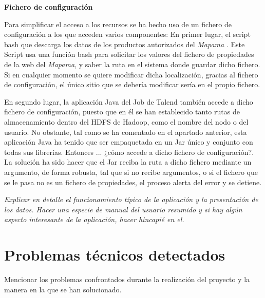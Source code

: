 \bigskip
\par 
\textbf{Fichero de configuración}
\par
Para simplificar el acceso a los recursos se ha hecho uso de un fichero de configuración a los que acceden varios componentes: En primer lugar, el script bash que descarga los datos de los productos autorizados del \textit{Mapama} \cite{mapama}. Este Script usa una función bash para solicitar los valores del fichero de propiedades de la web del \textit{Mapama}, y saber la ruta en el sistema donde guardar dicho fichero. Si en cualquier momento se quiere modificar dicha localización, gracias al fichero de configuración, el único sitio que se debería modificar sería en el propio fichero. 
\par En segundo lugar, la aplicación Java del Job de Talend también accede a dicho fichero de configuración, puesto que en él se han establecido tanto rutas de almacenamiento dentro del HDFS de Hadoop, como el nombre del nodo o del usuario. No obstante, tal como se ha comentado en el apartado anterior, esta aplicación Java ha tenido que ser empaquetada en un Jar único y conjunto con todas sus librerías. Entonces ... ¿cómo accede a dicho fichero de configuración?. La solución ha sido hacer que el Jar reciba la ruta a dicho fichero mediante un argumento, de forma robusta, tal que si no recibe argumentos, o si el fichero que se le pasa no es un fichero de propiedades, el proceso alerta del error y se detiene. 
\bigskip
\par
\textit{Explicar en detalle el funcionamiento típico de la aplicación y la presentación de los datos. Hacer una especie de manual del usuario resumido y si hay algún aspecto interesante de la aplicación, hacer hincapié en el.}
\section{Problemas técnicos detectados}
Mencionar los problemas confrontados durante la realización del proyecto y la manera en la que se han solucionado.
